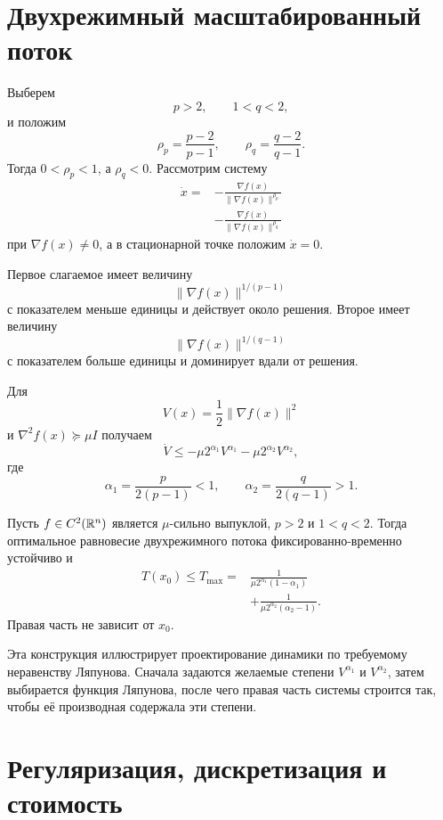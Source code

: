 \section{Двухрежимный масштабированный поток}

Выберем
\[
    p>2,
    \qquad
    1<q<2,
\]
и положим
\[
    \rho_p=\frac{p-2}{p-1},
    \qquad
    \rho_q=\frac{q-2}{q-1}.
\]
Тогда \(0<\rho_p<1\), а \(\rho_q<0\). Рассмотрим систему
\[
\begin{aligned}
    \dot x
    ={}&
    -\frac{\nabla f(x)}
    {\lVert\nabla f(x)\rVert^{\rho_p}}
    \\
    &-
    \frac{\nabla f(x)}
    {\lVert\nabla f(x)\rVert^{\rho_q}}
\end{aligned}
\]
при \(\nabla f(x)\ne0\), а в стационарной точке положим
\(\dot x=0\).

Первое слагаемое имеет величину
\[
    \lVert\nabla f(x)\rVert^{1/(p-1)}
\]
с показателем меньше единицы и действует около решения. Второе имеет
величину
\[
    \lVert\nabla f(x)\rVert^{1/(q-1)}
\]
с показателем больше единицы и доминирует вдали от решения.

Для
\[
    V(x)=\frac12\lVert\nabla f(x)\rVert^2
\]
и \(\nabla^2f(x)\succeq\mu I\) получаем
\[
    \dot V
    \le
    -\mu2^{\alpha_1}V^{\alpha_1}
    -\mu2^{\alpha_2}V^{\alpha_2},
\]
где
\[
    \alpha_1=\frac{p}{2(p-1)}<1,
    \qquad
    \alpha_2=\frac{q}{2(q-1)}>1.
\]

\begin{theorem}
Пусть \(f\in C^2(\mathbb{R}^n)\) является \(\mu\)-сильно выпуклой,
\(p>2\) и \(1<q<2\). Тогда оптимальное равновесие двухрежимного
потока фиксированно-временно устойчиво и
\[
\begin{aligned}
    T(x_0)
    \le T_{\max}
    ={}&
    \frac1{
        \mu2^{\alpha_1}(1-\alpha_1)
    }
    \\
    &+
    \frac1{
        \mu2^{\alpha_2}(\alpha_2-1)
    }.
\end{aligned}
\]
Правая часть не зависит от \(x_0\).
\end{theorem}

Эта конструкция иллюстрирует проектирование динамики по требуемому
неравенству Ляпунова. Сначала задаются желаемые степени
\(V^{\alpha_1}\) и \(V^{\alpha_2}\), затем выбирается функция
Ляпунова, после чего правая часть системы строится так, чтобы её
производная содержала эти степени.

\section{Регуляризация, дискретизация и стоимость}

